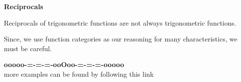 \documentclass{ximera}
\begin{document}
\begin{warning} \textbf{\textcolor{red!70!black}{Reciprocals}} 


Reciprocals of trigonometric functions are not always trigonometric functions.


Since, we use function categories as our reasoning for many characteristics, we must be careful.


\end{warning}










































\begin{center}
\textbf{\textcolor{green!50!black}{ooooo-=-=-=-ooOoo-=-=-=-ooooo}} \\

more examples can be found by following this link\\ 

\end{center}
\end{document}
